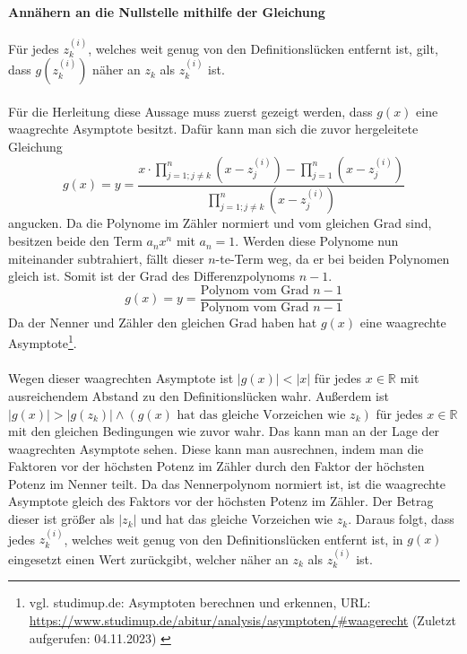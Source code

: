 \documentclass[12pt]{article}
\begin{document}
\paragraph{Annähern an die Nullstelle mithilfe der Gleichung}
Für jedes $z_k^{(i)}$, welches weit genug von den Definitionslücken entfernt ist, gilt, dass $g(z_k^{(i)})$ näher an $z_k$ als $z_k^{(i)}$ ist.\\\\
Für die Herleitung diese Aussage muss zuerst gezeigt werden, dass $g(x)$ eine waagrechte Asymptote besitzt. Dafür kann man sich die zuvor hergeleitete Gleichung
\begin{equation*}
    g(x) = y = \frac{x \cdot \prod_{j=1;j\neq k}^{n} (x-z_j^{(i)}) - \prod_{j=1}^{n} (x-z_j^{(i)})}{\prod_{j=1;j\neq k}^{n} (x-z_j^{(i)})}
\end{equation*}
angucken. Da die Polynome im Zähler normiert und vom gleichen Grad sind, besitzen beide den Term $a_nx^n$ mit $a_n = 1$. Werden diese Polynome nun miteinander subtrahiert, fällt dieser $n$-te-Term weg, da er bei beiden Polynomen gleich ist. Somit ist der Grad des Differenzpolynoms $n-1$. \\
\begin{equation*}
    g(x) = y = \frac{\text{Polynom vom Grad }n-1}{\text{Polynom vom Grad }n-1}
\end{equation*}
Da der Nenner und Zähler den gleichen Grad haben hat $g(x)$ eine waagrechte Asymptote\footnote{
    vgl. studimup.de: Asymptoten berechnen und erkennen, URL: \url{https://www.studimup.de/abitur/analysis/asymptoten/#waagerecht} (Zuletzt aufgerufen: 04.11.2023) \label{ftn:studimup.de}
}.\\\\
Wegen dieser waagrechten Asymptote ist $|g(x)|<|x|$ für jedes $x \in \mathbb{R}$ mit ausreichendem Abstand zu den Definitionslücken wahr. Außerdem ist $|g(x)|>|g(z_k)| \land (g(x) \text{ hat das gleiche Vorzeichen wie } z_k)$ für jedes $x \in \mathbb{R}$ mit den gleichen Bedingungen wie zuvor wahr.
Das kann man an der Lage der waagrechten Asymptote sehen. Diese kann man ausrechnen, indem man die Faktoren vor der höchsten Potenz im Zähler durch den Faktor der höchsten Potenz im Nenner teilt. Da das Nennerpolynom normiert ist, ist die waagrechte Asymptote gleich des Faktors vor der höchsten Potenz im Zähler. Der Betrag dieser ist größer als $|z_k|$ und hat das gleiche Vorzeichen wie $z_k$.
Daraus folgt, dass jedes $z_k^{(i)}$, welches weit genug von den Definitionslücken entfernt ist, in $g(x)$ eingesetzt einen Wert zurückgibt, welcher näher an $z_k$ als $z_k^{(i)}$ ist.
\end{document}
